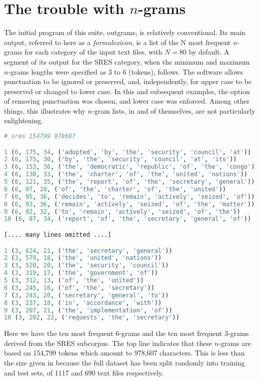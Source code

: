 \documentclass[output=paper]{langscibook}
\begin{document}
\clearpage
\section{The trouble with $n$-grams}\label{sec:forsyth:3}

The initial program of this suite, outgrams, is relatively conventional. Its main output, referred to here as a \textit{formulexicon}, is a list of the N most frequent $n$-grams for each category of the input text files, with $N=80$ by default. A segment of its output for the SRES category, when the minimum and maximum $n$-grams lengths were specified as 3 to 6 (tokens), follows. The software allows punctuation to be ignored or preserved, and, independently, for upper case to be preserved or changed to lower case. In this and subsequent examples, the option of removing punctuation was chosen, and lower case was enforced. Among other things, this illustrates why $n$-gram lists, in and of themselves, are not particularly enlightening.\bigskip

\begin{lstlisting}[language=Python,basicstyle=\footnotesize\ttfamily]
# sres 154799 978607

1 (6, 175, 34, ('adopted', 'by', 'the', 'security', 'council', 'at'))
2 (6, 175, 30, ('by', 'the', 'security', 'council', 'at', 'its'))
3 (6, 153, 36, ('the', 'democratic', 'republic', 'of', 'the', 'congo'))
4 (6, 130, 33, ('the', 'charter', 'of', 'the', 'united', 'nations'))
5 (6, 121, 35, ('the', 'report', 'of', 'the', 'secretary', 'general'))
6 (6, 97, 28, ('of', 'the', 'charter', 'of', 'the', 'united'))
7 (6, 95, 36, ('decides', 'to', 'remain', 'actively', 'seized', 'of'))
8 (6, 93, 36, ('remain', 'actively', 'seized', 'of', 'the', 'matter'))
9 (6, 92, 32, ('to', 'remain', 'actively', 'seized', 'of', 'the'))
10 (6, 87, 34, ('report', 'of', 'the', 'secretary', 'general', 'of'))

[.... many lines omitted ....]

1 (3, 624, 21, ('the', 'secretary', 'general'))
2 (3, 579, 18, ('the', 'united', 'nations'))
3 (3, 520, 20, ('the', 'security', 'council')) 
4 (3, 319, 17, ('the', 'government', 'of'))
5 (3, 312, 13, ('of', 'the', 'united'))
6 (3, 245, 16, ('of', 'the', 'secretary'))
7 (3, 243, 20, ('secretary', 'general', 'to'))
8 (3, 237, 18, ('in', 'accordance', 'with'))
9 (3, 207, 21, ('the', 'implementation', 'of'))
10 (3, 202, 22, ('requests', 'the', 'secretary'))
\end{lstlisting}

Here we have the ten most frequent 6-grams and the ten most frequent 3-grams derived from the SRES subcorpus. The top line indicates that these $n$-grams are based on 154,799 tokens which amount to 978,607 characters. This is less than the size given in  because the full dataset has been split randomly into training and test sets, of 1117 and 690 text files respectively.
\end{document}
